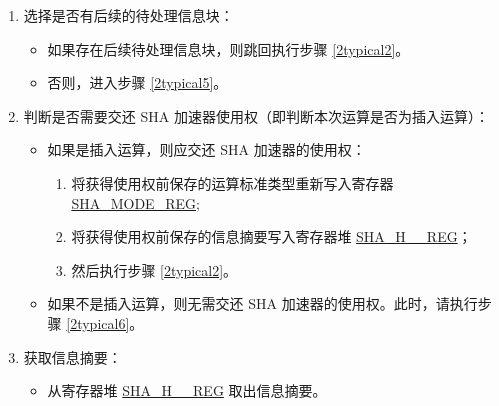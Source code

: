 \documentclass[main\_\_CN.tex]{subfiles}
\begin{document}
\begin{enumerate}
\begin{itemize}
            \item 如需插入，则准备移交 SHA 加速器使用权：
            \begin{enumerate}
            \item 读取并保存寄存器 \hyperref[regdesc:SHAMODEREG]{SHA\_MODE\_REG} 中的运算标准类型；
            \item 读取并保存寄存器堆 \hyperref[regdesc:SHAHNREG]{SHA\_H\_\_REG} 中的信息摘要；
            \item 最后，跳转至相应流程进行插入运算。具体按照插入运行类型的不同，请见 \hyperref[subsection:typicalsha]{Typical SHA} 或 \hyperref[subsection:dma-sha]{DMA-SHA} 章节。
            \end{enumerate}
            \item 如无需插入，则继续执行步骤 \ref{2typical4}。
        \end{itemize}

    \item \label{2typical4}
    选择是否有后续的待处理信息块：
        \begin{itemize}
            \item 如果存在后续待处理信息块，则跳回执行步骤 \ref{2typical2}。
            \item 否则，进入步骤 \ref{2typical5}。
        \end{itemize}

    \item \label{2typical5} 判断是否需要交还 SHA 加速器使用权（即判断本次运算是否为插入运算）：
        \begin{itemize}
            \item 如果是插入运算，则应交还 SHA 加速器的使用权：
            \begin{enumerate}
                \item 将获得使用权前保存的运算标准类型重新写入寄存器 \hyperref[regdesc:SHAMODEREG]{SHA\_MODE\_REG};
                \item 将获得使用权前保存的信息摘要写入寄存器堆 \hyperref[regdesc:SHAHNREG]{SHA\_H\_\_REG}；
                \item 然后执行步骤 \ref{2typical2}。
            \end{enumerate}
            \item 如果不是插入运算，则无需交还 SHA 加速器的使用权。此时，请执行步骤 \ref{2typical6}。
        \end{itemize}

    \item \label{2typical6}获取信息摘要：
    \begin{itemize}
        \item 从寄存器堆 \hyperref[regdesc:SHAHNREG]{SHA\_H\_\_REG} 取出信息摘要。
    \end{itemize}
\end{enumerate}
\end{document}
